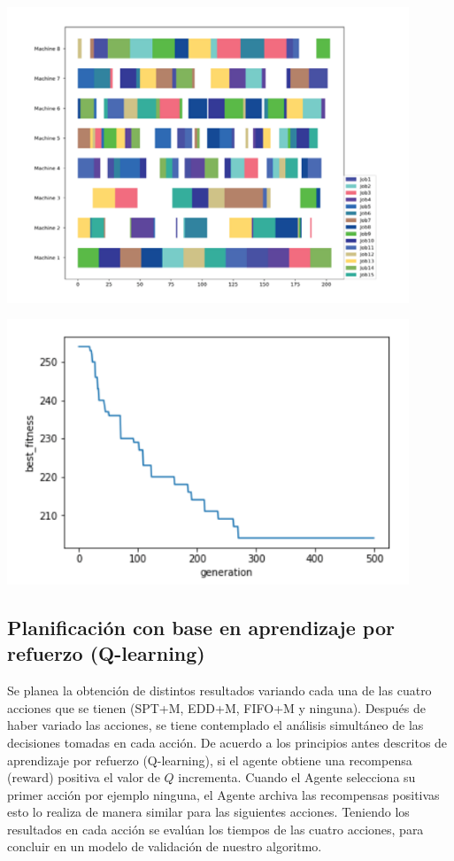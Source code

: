 \documentclass[letterpaper, 10 pt]{article}
\newenvironment{Figura}
{\par\medskip\noindent\minipage{\linewidth}}
{\endminipage\par\medskip}
\begin{document}
\begin{Figura}
	\centering
	\includegraphics[width=0.9\textwidth]{GA-grafica.png}
	\label{fig:3}
\end{Figura}  

\begin{Figura}
	\centering
	\includegraphics[width=0.9\textwidth]{fitness-generation.png}
	\label{fig:4}
\end{Figura}  

\subsection{Planificación con base en aprendizaje por refuerzo (Q-learning)}

Se planea la obtención de distintos resultados variando cada una de las cuatro acciones que se tienen (SPT+M, EDD+M, FIFO+M y ninguna). Después de haber variado las acciones, se tiene contemplado el análisis simultáneo de las decisiones tomadas en cada acción. De acuerdo a los principios antes descritos de aprendizaje por refuerzo (Q-learning), si el agente obtiene una recompensa (reward) positiva el valor de $Q$ incrementa. Cuando el Agente selecciona su primer acción por ejemplo ninguna, el Agente archiva las recompensas positivas esto lo realiza de manera similar para las siguientes acciones. Teniendo los resultados en cada acción se evalúan los tiempos de las cuatro acciones, para concluir en un modelo de validación de nuestro algoritmo.
\end{document}
